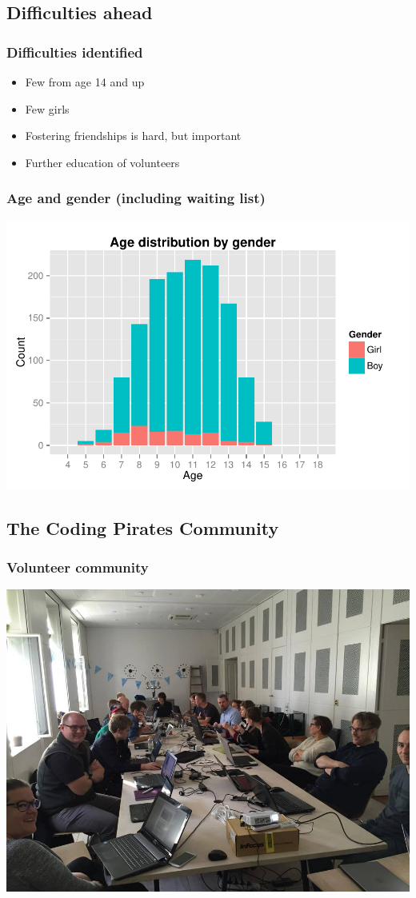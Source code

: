\documentclass{beamer}
\begin{document}
\subsection{Difficulties ahead}
\begin{frame}
\frametitle{Difficulties identified}
\begin{itemize}
\item Few from age 14 and up
\item Few girls
\item Fostering friendships is hard, but important
\item Further education of volunteers
\end{itemize}
\end{frame}

\begin{frame}
  \frametitle{Age and gender (including waiting list)}
  \centerline{\includegraphics[width=\textwidth]{../datacrunching/age-gender-hist}}
\end{frame}

\subsection{The Coding Pirates Community}
\begin{frame}
  \frametitle{Volunteer community}
  \includegraphics[width=\textwidth]{imagery/unity-for-volunteers.jpg}
\end{frame}
\end{document}

